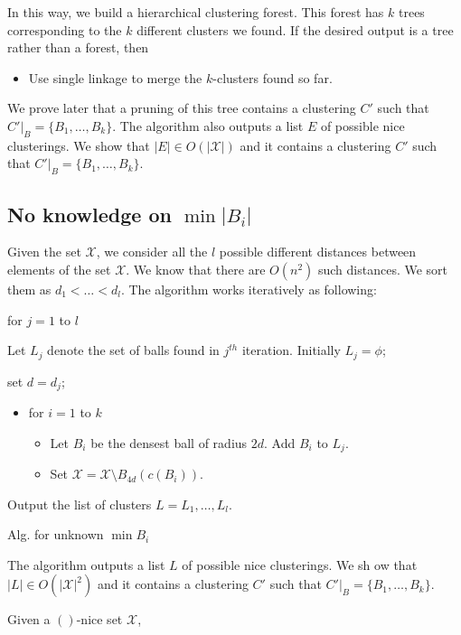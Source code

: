 \documentclass[11pt]{article}
\newenvironment{alg}{
    \begin{list}{}{
        \setlength{\itemsep}{2pt}
        \setlength{\parsep}{0pt}
        \setlength{\parskip}{0pt}
        \setlength{\topsep}{1pt}
    }
}
{
    \end{list}
}
\begin{document}
\noindent In this way, we build a hierarchical clustering forest. This forest has $k$ trees corresponding to the $k$ different clusters we found. If the desired output is a tree rather than a forest, then 
\begin{itemize}
\item Use single linkage to merge the $k$-clusters found so far. 
\end{itemize}

We prove later that a pruning of this tree contains a clustering $C'$ such that $C'|_B = \{B_1,\ldots,B_k\}$. The algorithm also outputs a list $E$ of possible nice clusterings. We show that $|E| \in O(|\mathcal{X}|)$ and it contains a clustering $C'$ such that $C'|_B = \{B_1,\ldots,B_k\}$.

\subsection{No knowledge on $\min |B_i|$ }

Given the set $\mathcal{X}$,
we consider all the $l$ possible different distances between elements of the set $\mathcal{X}$. We know that there are $O(n^2)$ such distances. We sort them as $d_1<\ldots<d_l$. The algorithm works iteratively as following:


\begin{algorithm}
\begin{alg}
\label{NotKnown}

\item[] for $j=1$ to $l$
\item[] Let $L_j$ denote the set of balls found in $j^{th}$ iteration. Initially $L_j=\phi$;
\item[] set $d=d_j$;

\begin{itemize}

\item[] for $i=1$ to $k$

\begin{itemize}

\item[] Let $B_i$ be the densest ball of radius $2d$. Add $B_i$ to $L_j$.
\item[] Set $\mathcal{X}=\mathcal{X}\setminus B_{4d}(c(B_i))$. 

\end{itemize}

\end{itemize}

Output the list of clusters $L={L_1,\ldots,L_l}$.
\end{alg}
\caption{Alg. for unknown $\min{B_i}$}
\end{algorithm}

\noindent The algorithm outputs a list $L$ of possible nice clusterings. We sh ow that $|L| \in O(|\mathcal{X}|^2)$ and it contains a clustering $C'$ such that $C'|_B = \{B_1,\ldots,B_k\}$.

\begin{theorem}
Given a $()$-nice set $\mathcal{X}$,
\end{theorem}
\end{document}
